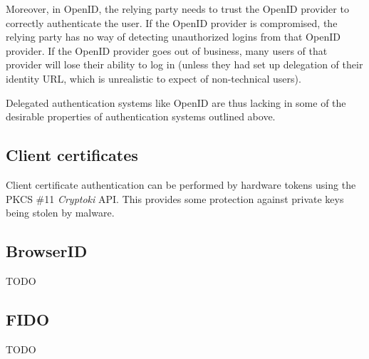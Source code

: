 Moreover, in OpenID, the relying party needs to trust the OpenID provider to correctly authenticate
the user. If the OpenID provider is compromised, the relying party has no way of detecting
unauthorized logins from that OpenID provider. If the OpenID provider goes out of business, many
users of that provider will lose their ability to log in (unless they had set up delegation of their
identity URL, which is unrealistic to expect of non-technical users).

Delegated authentication systems like OpenID are thus lacking in some of the desirable properties of
authentication systems outlined above.

\subsection{Client certificates}

Client certificate authentication can be performed by hardware tokens using the PKCS \#11
\emph{Cryptoki} API. This provides some protection against private keys being stolen by malware.

\subsection{BrowserID}
TODO
\subsection{FIDO}
TODO
